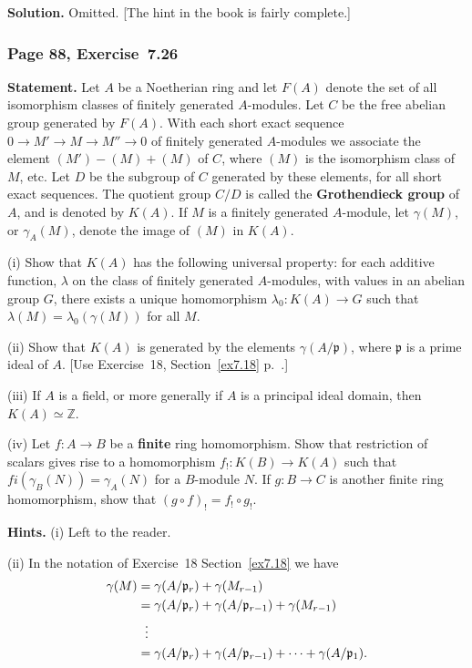 \documentclass[12pt,letterpaper]{article}%
\newcommand{\mf}{\mathfrak}
\newcommand{\ppp}{\mf p}
\newcommand{\nn}{\noindent}
\begin{document}
\nn\textbf{Solution.} Omitted. [The hint in the book is fairly complete.]

\subsubsection{Page 88, Exercise~7.26}%

\textbf{Statement.} Let $A$ be a Noetherian ring and let $F(A)$ denote the set of all isomorphism classes of finitely generated $A$-modules. Let $C$ be the free abelian group generated by $F(A)$. With each short exact sequence $0\to M'\to M\to M''\to0$ of finitely generated $A$-modules we associate the element $(M')-(M)+(M)$ of $C$, where $(M)$ is the isomorphism class of $M$, etc. Let $D$ be the subgroup of $C$ generated by these elements, for all short exact sequences. The quotient group $C/D$ is called the \textbf{Grothendieck group} of $A$, and is denoted by $K(A)$. If $M$ is a finitely generated $A$-module, let $\gamma(M)$, or $\gamma_A(M)$, denote the image of $(M)$ in $K(A)$.

\nn(i) Show that $K(A)$ has the following universal property: for each additive function, $\lambda$ on the class of finitely generated $A$-modules, with values in an abelian group $G$, there exists a unique homomorphism $\lambda_0:K(A)\to G$ such that $\lambda(M)=\lambda_0(\gamma(M))$ for all $M$.

\nn(ii) Show that $K(A)$ is generated by the elements $\gamma(A/\ppp)$, where $\ppp$ is a prime ideal of $A$. [Use Exercise~18, Section~\ref{ex7.18} p.~\pageref{ex7.18}.]

\nn(iii) If $A$ is a field, or more generally if $A$ is a principal ideal domain, then $K(A)\simeq\mathbb Z$.

\nn(iv) Let $f:A\to B$ be a \textbf{finite} ring homomorphism. Show that restriction of scalars gives rise to a homomorphism $f_!:K(B)\to K(A)$ such that $fi(\gamma_B(N))=\gamma_A(N)$ for a $B$-module $N$. If $g:B\to C$ is another finite ring homomorphism, show that $(g\circ f)_!=f_!\circ g_!$.

\nn\textbf{Hints.} (i) Left to the reader.

\nn(ii) In the notation of Exercise~18 Section~\ref{ex7.18} we have 
\begin{align*}
\gamma(M)&=\gamma(A/\ppp_r)+\gamma(M_{r-1}) \\ 
&=\gamma(A/\ppp_r)+\gamma(A/\ppp_{r-1})+\gamma(M_{r-1})\\ 
&\hskip6pt\vdots\\ 
&=\gamma(A/\ppp_r)+\gamma(A/\ppp_{r-1})+\cdots+\gamma(A/\ppp_1).
\end{align*}
\end{document}
